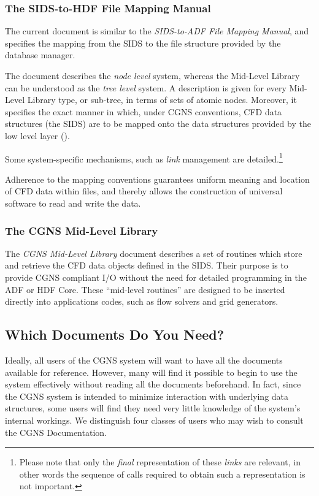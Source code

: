 \subsubsection{The SIDS-to-HDF File Mapping Manual}

The current document is similar to the
\textit{SIDS-to-ADF File Mapping Manual},
and specifies the mapping from the
SIDS to the file structure provided by the \HDF database manager.

The document describes the \emph{node level} system, whereas the
Mid-Level Library can be understood as the \emph{tree level} system.
A description
is given for every Mid-Level Library type, or sub-tree, in terms of sets
of atomic nodes. Moreover, it specifies the exact manner in which, under
CGNS conventions, CFD data structures (the SIDS) are to be 
mapped onto the data structures provided by the low level layer
(\HDF).

Some system-specific mechanisms, such as \emph{link} management are
detailed.\footnote{Please note that only the \emph{final}
representation of these \emph{links} are relevant, in other words
the sequence of \HDF calls required to obtain such a representation
is not important.}

Adherence to the mapping conventions guarantees uniform meaning
and location of CFD data within \HDF files, and thereby allows the
construction of universal software to read and write the data.

\subsubsection{The CGNS Mid-Level Library}

The \textit{CGNS Mid-Level Library} document describes a set of routines
which store and retrieve the CFD data objects defined in the SIDS.
Their purpose is to provide CGNS compliant I/O without the need for
detailed programming in the ADF or HDF Core.
These ``mid-level routines'' are designed to be inserted directly into
applications codes, such as flow solvers and grid generators.

\subsection{Which Documents Do You Need?}

Ideally, all users of the CGNS system will want to have all the
documents available for reference. However, many will find it possible
to begin to use the system effectively without reading all the documents
beforehand.  In fact, since the CGNS system is intended to minimize
interaction with underlying data structures, some users will find
they need very little knowledge of the system's internal workings. We
distinguish four classes of users who may wish to consult the CGNS
Documentation.

